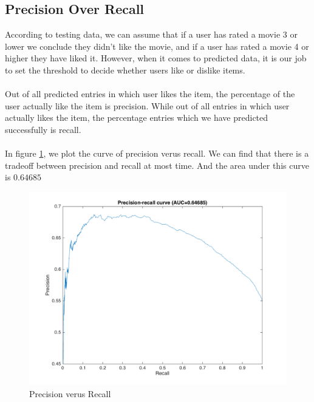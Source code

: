 \documentclass{article}
\begin{document}
\subsection{Precision Over Recall}
According to testing data, we can assume that if a user has rated a movie 3 or lower we conclude they didn't like the movie, and if a user has rated a movie 4 or higher they have liked it. However, when it comes to predicted data, it is our job to set the threshold to decide whether users like or dislike items.\\
\\
Out of all predicted entries in which user likes the item, the percentage of the user actually like the item is precision. While out of all entries in which user actually likes the item, the percentage entries which we have predicted successfully is recall.\\
\\
In figure \ref{fig:problem3}, we plot the curve of precision verus recall. We can find that there is a tradeoff between precision and recall at most time. And the area under this curve is $0.64685$
\begin{figure}[htbp]
\centering
\includegraphics[width=.6\textwidth]{problem3.png}
\caption{Precision verus Recall}
\label{fig:problem3}
\end{figure}
\end{document}
